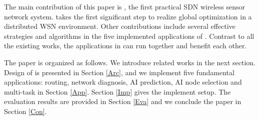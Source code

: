 The main contribution of this paper is {\sdn}, the first 
practical SDN wireless sensor network system. 
{\sdn} takes the first significant step to realize global optimization in a distributed WSN environment.
Other contributions include several effective strategies and algorithms 
in the five implemented applications of {\sdn}. 
Contrast to all the existing works, the applications in {\sdn}
can run together and benefit each other. 



The paper is organized as follows. We introduce related works in the next section. 
Design of {\sdn} is presented in Section \ref{Arc}, 
and we implement five fundamental applications: routing, network diagnosis, 
AI prediction, AI node selection and multi-task in Section \ref{App}. 
Section \ref{Imp} gives the implement setup.
The evaluation results are provided in Section \ref{Eva} 
and we conclude the paper in Section \ref{Con}.
